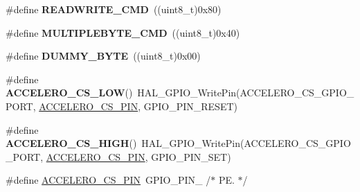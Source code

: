 \begin{DoxyCompactItemize}
\#define {\bfseries R\+E\+A\+D\+W\+R\+I\+T\+E\+\_\+\+C\+MD}~((uint8\+\_\+t)0x80)
\item 
\mbox{\label{group___s_t_m32_f4___d_i_s_c_o_v_e_r_y___l_o_w___l_e_v_e_l___b_u_s_ga8978e114e63e88d9763967ab84388774}} 
\#define {\bfseries M\+U\+L\+T\+I\+P\+L\+E\+B\+Y\+T\+E\+\_\+\+C\+MD}~((uint8\+\_\+t)0x40)
\item 
\mbox{\label{group___s_t_m32_f4___d_i_s_c_o_v_e_r_y___l_o_w___l_e_v_e_l___b_u_s_gadc81a065700d3af56b6fb631585e3641}} 
\#define {\bfseries D\+U\+M\+M\+Y\+\_\+\+B\+Y\+TE}~((uint8\+\_\+t)0x00)
\item 
\mbox{\label{group___s_t_m32_f4___d_i_s_c_o_v_e_r_y___l_o_w___l_e_v_e_l___b_u_s_ga68d443fa26fc28e8d110f61f0e3119a5}} 
\#define {\bfseries A\+C\+C\+E\+L\+E\+R\+O\+\_\+\+C\+S\+\_\+\+L\+OW}()~H\+A\+L\+\_\+\+G\+P\+I\+O\+\_\+\+Write\+Pin(A\+C\+C\+E\+L\+E\+R\+O\+\_\+\+C\+S\+\_\+\+G\+P\+I\+O\+\_\+\+P\+O\+RT, \mbox{\hyperlink{group___s_t_m32_f4___d_i_s_c_o_v_e_r_y___l_o_w___l_e_v_e_l___b_u_s_ga5cfd56195b6e0e789bac730d4588550f}{A\+C\+C\+E\+L\+E\+R\+O\+\_\+\+C\+S\+\_\+\+P\+IN}}, G\+P\+I\+O\+\_\+\+P\+I\+N\+\_\+\+R\+E\+S\+ET)
\item 
\mbox{\label{group___s_t_m32_f4___d_i_s_c_o_v_e_r_y___l_o_w___l_e_v_e_l___b_u_s_ga9ad948d939de246e73a6c8b4f17c785b}} 
\#define {\bfseries A\+C\+C\+E\+L\+E\+R\+O\+\_\+\+C\+S\+\_\+\+H\+I\+GH}()~H\+A\+L\+\_\+\+G\+P\+I\+O\+\_\+\+Write\+Pin(A\+C\+C\+E\+L\+E\+R\+O\+\_\+\+C\+S\+\_\+\+G\+P\+I\+O\+\_\+\+P\+O\+RT, \mbox{\hyperlink{group___s_t_m32_f4___d_i_s_c_o_v_e_r_y___l_o_w___l_e_v_e_l___b_u_s_ga5cfd56195b6e0e789bac730d4588550f}{A\+C\+C\+E\+L\+E\+R\+O\+\_\+\+C\+S\+\_\+\+P\+IN}}, G\+P\+I\+O\+\_\+\+P\+I\+N\+\_\+\+S\+ET)
\item 
\mbox{\label{group___s_t_m32_f4___d_i_s_c_o_v_e_r_y___l_o_w___l_e_v_e_l___b_u_s_ga5cfd56195b6e0e789bac730d4588550f}} 
\#define \mbox{\hyperlink{group___s_t_m32_f4___d_i_s_c_o_v_e_r_y___l_o_w___l_e_v_e_l___b_u_s_ga5cfd56195b6e0e789bac730d4588550f}{A\+C\+C\+E\+L\+E\+R\+O\+\_\+\+C\+S\+\_\+\+P\+IN}}~G\+P\+I\+O\+\_\+\+P\+I\+N\+\_                 /$\ast$ P\+E. $\ast$/

\end{DoxyCompactItemize}
